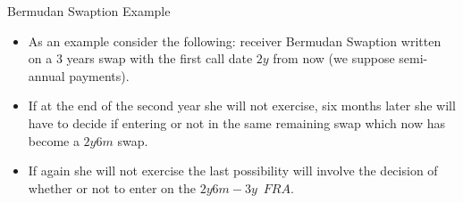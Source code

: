 \documentclass{beamer}
\begin{document}
\begin{frame}{Bermudan Swaption Example}
\begin{itemize}
	\item As an example consider the following: receiver Bermudan Swaption written on a 3 years swap with the first call date $2y$ from now (we suppose semi-annual payments).
	\item If at the end of the second year she will not exercise, six months later she will have to decide if entering or not in the same remaining swap which now has become a $2y6m$ swap.
	\item If again she will not exercise the last possibility will involve the decision of whether or not to enter on the $2y6m-3y$~$FRA$.
\end{itemize}
\end{frame}		

\end{document}
